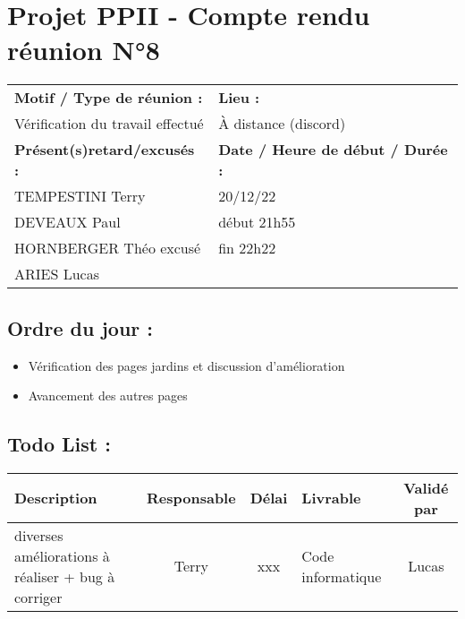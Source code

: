 \documentclass{article}
\begin{document}
\section*{Projet PPII - Compte rendu réunion N°8}
\begin{tabular}{|p{7cm}|p{6cm}|}
    \hline
    \textbf{Motif / Type de réunion :}
    & \textbf{Lieu :}
    \\
    Vérification du travail effectué
    & 
    À distance (discord)
    \\ \hline
    \textbf{Présent(s)retard/excusés :}
    &
    \textbf{Date / Heure de début / Durée :}
    \\ 
    TEMPESTINI Terry &  20/12/22\\  
    DEVEAUX Paul & début 21h55\\
    HORNBERGER Théo excusé & fin 22h22\\
    ARIES Lucas & 
    \\ \hline
\end{tabular}

\subsection*{Ordre du jour :}
\begin{itemize}
    \item{Vérification des pages jardins et discussion d'amélioration}
    \item{Avancement des autres pages}
\end{itemize}

\subsection*{Todo List :}
\begin{tabular}{|p{3.5cm}|c|c|p{4.5cm}|c|}
    \hline 
    Description & Responsable & Délai & Livrable & Validé par 
    \\ \hline
    diverses améliorations à réaliser + bug à corriger & Terry & xxx & Code informatique & Lucas\\ \hline
    
\end{tabular}
\end{document}
